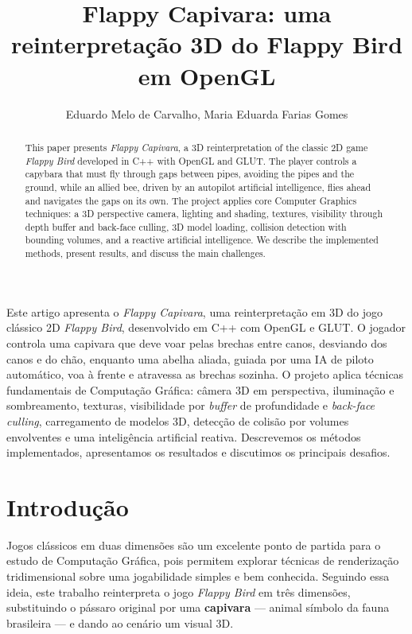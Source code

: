 \documentclass[12pt]{article}
\title{Flappy Capivara: uma reinterpretação 3D do Flappy Bird em OpenGL}
\author{Eduardo Melo de Carvalho\inst{1}, Maria Eduarda Farias Gomes\inst{1}}
\begin{document}
\maketitle

\begin{abstract}
This paper presents \emph{Flappy Capivara}, a 3D reinterpretation of the
classic 2D game \emph{Flappy Bird} developed in C++ with OpenGL and GLUT.
The player controls a capybara that must fly through gaps between pipes,
avoiding the pipes and the ground, while an allied bee, driven by an
autopilot artificial intelligence, flies ahead and navigates the gaps on
its own. The project applies core Computer Graphics techniques: a 3D
perspective camera, lighting and shading, textures, visibility through
depth buffer and back-face culling, 3D model loading, collision detection
with bounding volumes, and a reactive artificial intelligence. We describe
the implemented methods, present results, and discuss the main challenges.
\end{abstract}

\begin{resumo}
Este artigo apresenta o \emph{Flappy Capivara}, uma reinterpretação em 3D
do jogo clássico 2D \emph{Flappy Bird}, desenvolvido em C++ com OpenGL e
GLUT. O jogador controla uma capivara que deve voar pelas brechas entre
canos, desviando dos canos e do chão, enquanto uma abelha aliada, guiada por
uma IA de piloto automático, voa à frente e atravessa as brechas sozinha.
O projeto aplica técnicas fundamentais de
Computação Gráfica: câmera 3D em perspectiva, iluminação e sombreamento,
texturas, visibilidade por \emph{buffer} de profundidade e \emph{back-face
culling}, carregamento de modelos 3D, detecção de colisão por volumes
envolventes e uma inteligência artificial reativa. Descrevemos os métodos
implementados, apresentamos os resultados e discutimos os principais
desafios.
\end{resumo}

\section{Introdução}

Jogos clássicos em duas dimensões são um excelente ponto de partida para o
estudo de Computação Gráfica, pois permitem explorar técnicas de
renderização tridimensional sobre uma jogabilidade simples e bem conhecida.
Seguindo essa ideia, este trabalho reinterpreta o jogo \emph{Flappy Bird}
em três dimensões, substituindo o pássaro original por uma \textbf{capivara}
--- animal símbolo da fauna brasileira --- e dando ao cenário um visual 3D.
\end{document}
